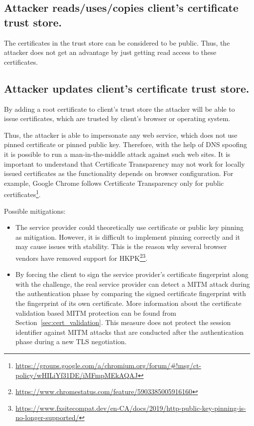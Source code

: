 \subsection{Attacker reads/uses/copies client's certificate trust store.}
\label{threat:read-trust-store}
The certificates in the trust store can be considered to be public. Thus, the attacker does not get an advantage by just getting read access to these certificates. 

\subsection{Attacker updates client's certificate trust store.}
\label{threat:update-trust-store}
By adding a root certificate to client's trust store the attacker will  be able to issue certificates, which are trusted by client's browser or operating system.

Thus, the attacker is able to impersonate any web service, which does not use pinned certificate or pinned public key. Therefore, with the help of DNS spoofing it is possible to run a man-in-the-middle attack against such web sites. It is important to understand that Certificate Transparency may not work for locally issued certificates as the functionality depends on browser configuration. For example, Google Chrome follows Certificate Transparency only for public certificates\footnote{\url{https://groups.google.com/a/chromium.org/forum/\#!msg/ct-policy/wHILiYf31DE/iMFmpMEkAQAJ}}. 

Possible mitigations:
\begin{itemize}
\item The service provider could theoretically use certificate or public key pinning as mitigation. However, it is difficult to implement pinning correctly and it may cause issues with stability. This is the reason why several browser vendors have removed support for HKPK\footnote{\url{https://www.chromestatus.com/feature/5903385005916160}}\footnote{\url{https://www.fxsitecompat.dev/en-CA/docs/2019/http-public-key-pinning-is-no-longer-supported/}}.

\item By forcing the client to sign the service provider's certificate fingerprint along with the challenge, the real service provider can detect a MITM attack during the authentication phase by comparing the signed certificate fingerprint with the fingerprint of its own certificate. More information about the certificate validation based MITM protection can be found from Section~\ref{sec:cert_validation}. This measure does not protect the session identifier against MITM attacks that are conducted after the authentication phase during a new TLS negotiation.
\end{itemize}


